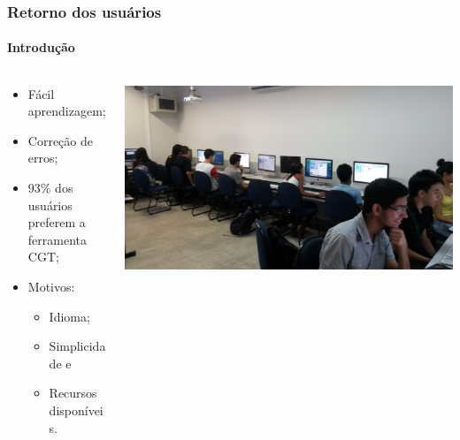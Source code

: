 \documentclass[]{beamer}
\begin{document}
   \begin{frame}
      \frametitle{Retorno dos usuários}
      \framesubtitle{Introdução}
      \begin{columns}[T]
         \begin{column}{0.48\textwidth}
            \begin{itemize}
               \item Fácil aprendizagem;
               \item Correção de erros;
               \item 93\% dos usuários preferem a ferramenta CGT;
               \item Motivos:
                  \begin{itemize}
                     \item Idioma;
                     \item Simplicidade e
                     \item Recursos disponíveis.
                  \end{itemize}
            \end{itemize}
         \end{column}
         \begin{column}{0.48\textwidth}
            \includegraphics[width=\textwidth]{images/ext/20150902_110944.jpg}
         \end{column}
      \end{columns}
   \end{frame}
\end{document}
